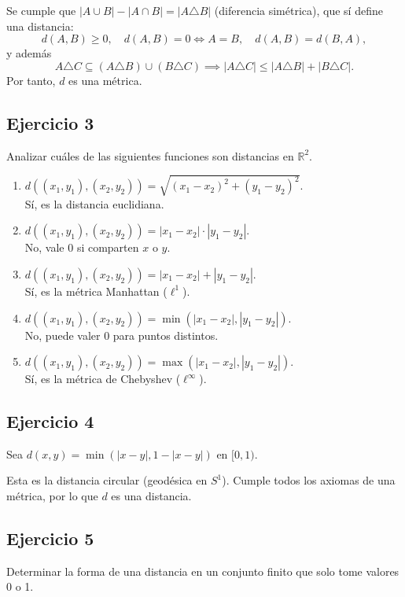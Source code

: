 \medskip
Se cumple que $|A\cup B| - |A\cap B| = |A\triangle B|$ (diferencia simétrica), que sí define una distancia: 
\[
d(A,B) \ge 0, \quad d(A,B)=0 \iff A=B, \quad d(A,B)=d(B,A),
\]
y además
\[
A\triangle C \subseteq (A\triangle B)\cup (B\triangle C) \implies |A\triangle C|\le |A\triangle B|+|B\triangle C|.
\]
Por tanto, $d$ es una métrica.

\subsection*{Ejercicio 3}
Analizar cuáles de las siguientes funciones son distancias en $\mathbb{R}^2$.

\begin{enumerate}[label=\alph*)]
\item $d((x_1,y_1),(x_2,y_2)) = \sqrt{(x_1-x_2)^2 + (y_1-y_2)^2}$. \\
Sí, es la distancia euclidiana.

\item $d((x_1,y_1),(x_2,y_2)) = |x_1 - x_2|\cdot |y_1 - y_2|$. \\
No, vale 0 si comparten $x$ o $y$.

\item $d((x_1,y_1),(x_2,y_2)) = |x_1 - x_2| + |y_1 - y_2|$. \\
Sí, es la métrica Manhattan ($\ell^1$).

\item $d((x_1,y_1),(x_2,y_2)) = \min(|x_1 - x_2|, |y_1 - y_2|)$. \\
No, puede valer 0 para puntos distintos.

\item $d((x_1,y_1),(x_2,y_2)) = \max(|x_1 - x_2|, |y_1 - y_2|)$. \\
Sí, es la métrica de Chebyshev ($\ell^\infty$).
\end{enumerate}

\subsection*{Ejercicio 4}
Sea $d(x,y) = \min(|x-y|, 1 - |x-y|)$ en $[0,1)$. 

\medskip
Esta es la distancia circular (geodésica en $S^1$). Cumple todos los axiomas de una métrica, por lo que $d$ es una distancia.

\subsection*{Ejercicio 5}
Determinar la forma de una distancia en un conjunto finito que solo tome valores 0 o 1.

